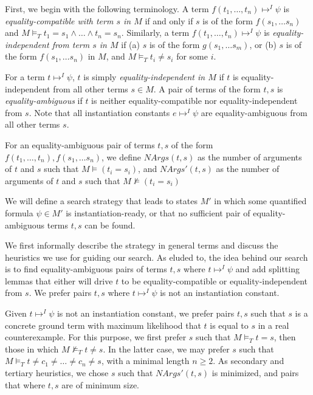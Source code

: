 \documentclass{llncs}
\begin{document}
First, we begin with the following terminology.
A term $f( t_1, \ldots, t_n ) \mapsto^I \psi$ is \emph{equality-compatible with term $s$ in $M$} if and only if $s$ is of the form $f( s_1, \ldots s_n )$ and $M \models_T t_1 = s_1 \wedge \ldots \wedge t_n = s_n$.
Similarly, a term $f( t_1, \ldots, t_n ) \mapsto^I \psi$ is \emph{equality-independent from term $s$ in $M$} if (a) $s$ is of the form $g( s_1, \ldots s_m )$, or (b) $s$ is of the form $f( s_1, \ldots s_n )$ in $M$, and $M \models_T t_i \neq s_i$ for some $i$. 

For a term $t \mapsto^I \psi$, $t$ is simply \emph{equality-independent in $M$} if $t$ is equality-independent from all other terms $s \in M$.  
A pair of terms of the form $t, s$ is \emph{equality-ambiguous} if $t$ is neither equality-compatible nor equality-independent from $s$.
Note that all instantiation constants $e \mapsto^I \psi$ are equality-ambiguous from all other terms $s$.

For an equality-ambiguous pair of terms $t, s$ of the form $f( t_1, \ldots, t_n ), f( s_1, \ldots s_n )$, we define $NArgs( t, s )$ as the number of arguments of $t$ and $s$ such that $M \models (t_i = s_i)$, and $NArgs'( t, s )$ as the number of arguments of $t$ and $s$ such that $M \not\models (t_i = s_i)$

We will define a search strategy that leads to states $M'$ in which some quantified formula $\psi \in M'$ is instantiation-ready, or that no sufficient pair of equality-ambiguous terms $t, s$ can be found.

We first informally describe the strategy in general terms and discuss the heuristics we use for guiding our search.
As eluded to, the idea behind our search is to find equality-ambiguous pairs of terms $t, s$ where $t \mapsto^I \psi$ and add splitting lemmas that either will drive $t$ to be equality-compatible or equality-independent from $s$.
We prefer pairs $t, s$ where $t \mapsto^I \psi$ is not an instantiation constant.

Given $t \mapsto^I \psi$ is not an instantiation constant, we prefer pairs $t, s$ such that $s$ is a concrete ground term with maximum likelihood that $t$ is equal to $s$ in a real counterexample.
For this purpose, we first prefer $s$ such that $M \models_T t = s$, then those in which $M \not\models_T t \neq s$.
In the latter case, we may prefer $s$ such that $M \models_T t \neq c_1 \neq \ldots \neq c_n \neq s$, with a minimal length $n \geq 2$.
As secondary and tertiary heuristics, we chose $s$ such that $NArgs'( t, s )$ is minimized, and pairs that where $t, s$ are of minimum size.
\end{document}
